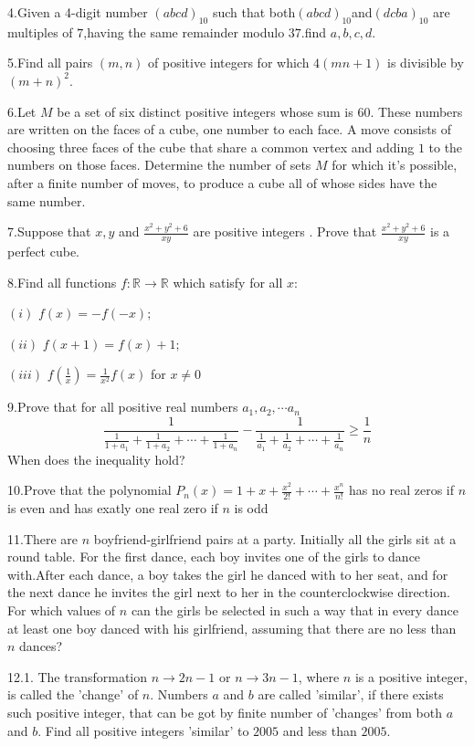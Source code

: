 \documentclass{article}
\begin{document}
4.Given a 4-digit number $(abcd)_{10}$ such that both$(abcd)_{10}$and$(dcba)_{10}$ are multiples of $7$,having the same remainder modulo $37$.find $a,b,c,d$.

5.Find all pairs $(m, n)$ of positive integers for which $4 (mn +1)$ is divisible by $(m + n)^2$.

6.Let $M$ be a set of six distinct positive integers whose sum is $60$. These numbers are written on the faces of a cube, one number to each face. A move consists of choosing three faces of the cube that share a common vertex and adding $1$ to the numbers on those faces. Determine the number of sets $M$ for which it’s possible, after a finite number of moves, to produce a cube all of whose sides have the same number.

7.Suppose that $x,y$ and $\frac{x^2+y^2+6}{xy}$ are positive integers . Prove that $\frac{x^2+y^2+6}{xy}$ is a perfect cube.

8.Find all functions $f:\mathbb{R}\to\mathbb{R}$ which satisfy for all $x$:

$(i)$ $f(x)=-f(-x);$

$(ii)$ $f(x+1)=f(x)+1;$

$(iii)$ $f\left( \frac{1}{x}\right)=\frac{1}{x^2}f(x)$ for $x\ne 0$

9.Prove that for all positive real numbers $a_1,a_2,\cdots a_n$ \[\frac{1}{\frac{1}{1+a_1}+\frac{1}{1+a_2}+\cdots +\frac{1}{1+a_n}}-\frac{1}{\frac{1}{a_1}+\frac{1}{a_2}+\cdots +\frac{1}{a_n}}\geq \frac{1}{n}\]When does the inequality hold?

10.Prove that the polynomial $P_n(x)=1+x+\frac{x^2}{2!}+\cdots +\frac{x^n}{n!}$ has no real zeros if $n$ is even and has exatly one real zero if $n$ is odd

11.There are $n$ boyfriend-girlfriend pairs at a party. Initially all the girls sit at a round table. For the first dance, each boy invites one of the girls to dance with.After each dance, a boy takes the girl he danced with to her seat, and for the next dance he invites the girl next to her in the counterclockwise direction. For which values of $n$ can the girls be selected in such a way that in every dance at least one boy danced with his girlfriend, assuming that there are no less than $n$ dances?

12.1. The transformation $ n \to 2n - 1$ or $ n \to 3n - 1$, where $ n$ is a positive integer, is called the 'change' of $ n$. Numbers $ a$ and $ b$ are called 'similar', if there exists such positive integer, that can be got by finite number of 'changes' from both $ a$ and $ b$. Find all positive integers 'similar' to $ 2005$ and less than $ 2005$.
\end{document}
